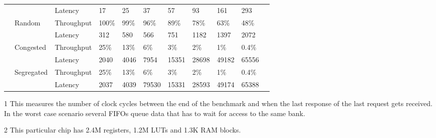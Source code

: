 \begin{table*}
\begin{threeparttable}
\begin{tabular}{|l|l|l|l|l|l|l|l|l|l|l|}
& & Latency \tnote{1} & 17 & 25 & 37 & 57 & 93 & 161 & 293 \\
&Random & Throughput & 100\% & 99\% & 96\% & 89\% & 78\% & 63\% & 48\% \\
& & Latency \tnote{1} & 312 & 580 & 566 & 751 & 1182 & 1397 & 2072 \\
&Congested & Throughput & 25\% & 13\% & 6\% & 3\% & 2\% & 1\% & 0.4\% \\
& & Latency \tnote{1} & 2040 & 4046 & 7954 & 15351 & 28698 & 49182 & 65556 \\
&Segregated & Throughput & 25\% & 13\% & 6\% & 3\% & 2\% & 1\% & 0.4\% \\
& & Latency \tnote{1} & 2037 & 4039 & 79530 & 15331 & 28593 & 49174 & 65388 \\
\hline
\end{tabular}
\begin{tablenotes}
\item[1] This measures the number of clock cycles between the end of the benchmark and when the last response of the last request gets received. In the worst case scenario several FIFOs queue data that has to wait for access to the same bank.
\item[2] This particular chip has 2.4M registers, 1.2M LUTs and 1.3K RAM blocks.
\end{tablenotes}
\end{threeparttable}
\end{table*}



